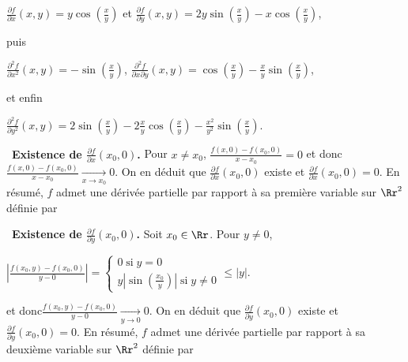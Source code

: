 {\begin{enumerate}
{\begin{center}
$\frac{\partial f}{\partial x}(x,y)=y\cos\left(\frac{x}{y}\right)$ et $\frac{\partial f}{\partial y}(x,y)=2y\sin\left(\frac{x}{y}\right)-x\cos\left(\frac{x}{y}\right)$,
\end{center}
puis

\begin{center}
$\frac{\partial^2f}{\partial x^2}(x,y)=-\sin\left(\frac{x}{y}\right)$, $\frac{\partial^2f}{\partial x\partial y}(x,y)=\cos\left(\frac{x}{y}\right)-\frac{x}{y}\sin\left(\frac{x}{y}\right)$,
\end{center}
et enfin

\begin{center}
$\frac{\partial^2f}{\partial y^2}(x,y)=2\sin\left(\frac{x}{y}\right)-2\frac{x}{y}\cos\left(\frac{x}{y}\right)-\frac{x^2}{y^2}\sin\left(\frac{x}{y}\right)$.
\end{center}
\textbullet~\textbf{Existence de $\frac{\partial f}{\partial x}(x_0,0)$.} Pour $x\neq x_0$,  $\frac{f(x,0)-f(x_0,0)}{x-x_0}=0$ et donc$\frac{f(x,0)-f(x_0,0)}{x-x_0}\underset{x\rightarrow x_0}{\rightarrow}0$. On en déduit que $\frac{\partial f}{\partial x}(x_0,0)$ existe et $\frac{\partial f}{\partial x}(x_0,0)=0$. En résumé, $f$ admet une dérivée partielle par rapport à sa première variable sur $\Rr^2$ définie par

\begin{center}
\end{center}
\textbullet~\textbf{Existence de $\frac{\partial f}{\partial y}(x_0,0)$.} Soit $x_0\in\Rr$. Pour $y\neq0$,  

\begin{center}
$\left|\frac{f(x_0,y)-f(x_0,0)}{y-0}\right|=\left\{
\begin{array}{l}
0\;\text{si}\;y=0\\
y\left|\sin\left(\frac{x_0}{y}\right)\right|\;\text{si}\;y\neq0
\end{array}
\right.\leqslant|y|.
$
\end{center} 

et donc$\frac{f(x_0,y)-f(x_0,0)}{y-0}\underset{y\rightarrow0}{\rightarrow}0$. On en déduit que $\frac{\partial f}{\partial y}(x_0,0)$ existe et $\frac{\partial f}{\partial y}(x_0,0)=0$. En résumé, $f$ admet une dérivée partielle par rapport à sa deuxième variable sur $\Rr^2$ définie par

}
\end{enumerate}}
